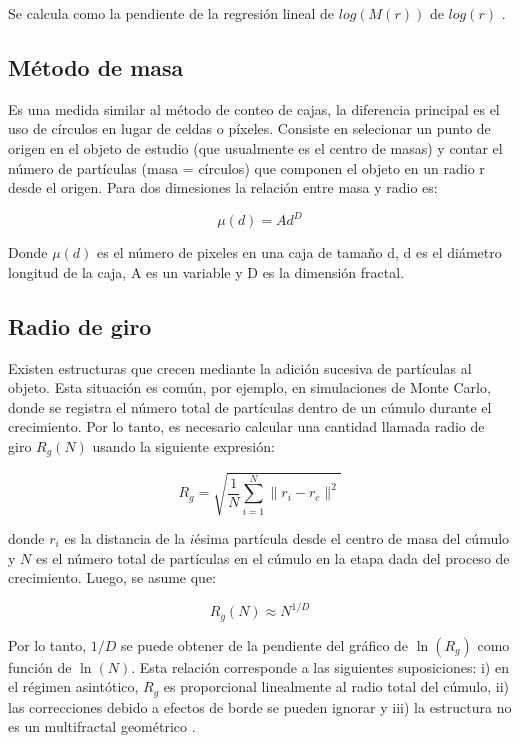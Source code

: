 \documentclass[11pt]{article}
\begin{document}
Se calcula como la pendiente de la regresi\'{o}n lineal de $log(M(r))$ de $log(r)$ \cite{Mustafa1996}.


\subsection{M\'{e}todo de masa}

Es una medida similar al m\'{e}todo de conteo de cajas, la diferencia principal es el uso de c\'{i}rculos en lugar de celdas o p\'{i}xeles. Consiste en selecionar un punto de origen en el objeto de estudio (que usualmente es el centro de masas) y contar el n\'{u}mero de part\'{i}culas (masa = c\'{i}rculos) que componen 	el objeto en un radio r desde el origen. Para dos dimesiones la relaci\'{o}n entre masa y radio es:

\begin{equation}
\mu(d) = Ad^D
\end{equation}

Donde $\mu(d)$ es el n\'{u}mero de pixeles en una caja de tamaño d, d es el di\'{a}metro longitud de la caja, A es un variable y D es la dimensi\'{o}n fractal\cite{Mustafa1996}. 

\subsection{Radio de giro}

Existen estructuras que crecen mediante la adici\'{o}n sucesiva de part\'{i}culas al objeto. Esta situaci\'{o}n es com\'{u}n, por ejemplo, en simulaciones de Monte Carlo, donde se registra el n\'{u}mero total de part\'{i}culas dentro de un c\'{u}mulo durante el crecimiento. Por lo tanto, es necesario calcular una cantidad llamada radio de giro  \(R_g(N)\) usando la siguiente expresi\'{o}n:

\begin{equation}
R_g = \sqrt{\frac{1}{N} \sum_{i=1}^{N} \| r_i - r_c \|^2}
\end{equation}

donde \(r_i\) es la distancia de la \(i\)\'{e}sima part\'{i}cula desde el centro de masa del c\'{u}mulo y \(N\) es el n\'{u}mero total de part\'{i}culas en el c\'{u}mulo en la etapa dada del proceso de crecimiento. Luego, se asume que:

\begin{equation}
R_g(N) \approx N^{1/D}
\end{equation}

Por lo tanto, \(1/D\) se puede obtener de la pendiente del gr\'{a}fico de \(\ln(R_g)\) como funci\'{o}n de \(\ln(N)\). Esta relaci\'{o}n corresponde a las siguientes suposiciones: i) en el r\'{e}gimen asint\'{o}tico, \(R_g\) es proporcional linealmente al radio total del c\'{u}mulo, ii) las correcciones debido a efectos de borde se pueden ignorar y iii) la estructura no es un multifractal geom\'{e}trico \cite{Mroczka2012, Vicsek1992}.
\end{document}
